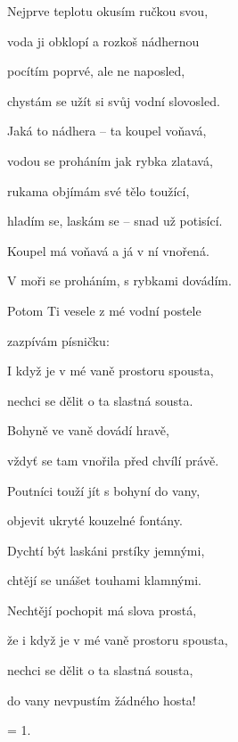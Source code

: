 

\zs
Nejprve teplotu okusím ručkou svou,

voda ji obklopí a rozkoš nádhernou

pocítím poprvé, ale ne naposled,

chystám se užít si svůj vodní slovosled.
\ks

\zs
Jaká to nádhera -- ta koupel voňavá,

vodou se proháním jak rybka zlatavá,

rukama objímám své tělo toužící,

hladím se, laskám se -- snad už potisící.
\ks

\zr
Koupel má voňavá a já v ní vnořená.

V moři se proháním, s rybkami dovádím.

Potom Ti vesele z mé vodní postele

zazpívám písničku: 
\kr

\zs
I když je v mé vaně prostoru spousta, 

nechci se dělit o ta slastná sousta.

Bohyně ve vaně dovádí hravě,

vždyť se tam vnořila před chvílí právě.
\ks

\zs
Poutníci touží jít s bohyní do vany,

objevit ukryté kouzelné fontány.

Dychtí být laskáni prstíky jemnými,

chtějí se unášet touhami klamnými.
\ks

\zs
Nechtějí pochopit má slova prostá,

že i když je v mé vaně prostoru spousta,

nechci se dělit o ta slastná sousta,

do vany nevpustím žádného hosta!
\ks

\zr
\kr

\zs
= 1.
\ks

\kp
